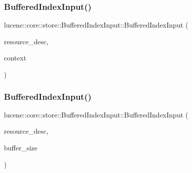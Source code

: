 \mbox{\label{classlucene_1_1core_1_1store_1_1BufferedIndexInput_ae480856ca86e73576266602d842c1391}} 
\subsubsection{\texorpdfstring{Buffered\+Index\+Input()}{BufferedIndexInput()}\hspace{0.1cm}{\footnotesize\ttfamily [2/3]}}
{\footnotesize\ttfamily lucene\+::core\+::store\+::\+Buffered\+Index\+Input\+::\+Buffered\+Index\+Input (\begin{DoxyParamCaption}\item[{\mbox{\hyperlink{ZlibCrc32_8h_a2c212835823e3c54a8ab6d95c652660e}{const}} std\+::string \&}]{resource\+\_\+desc,  }\item[{\mbox{\hyperlink{ZlibCrc32_8h_a2c212835823e3c54a8ab6d95c652660e}{const}} \mbox{\hyperlink{classlucene_1_1core_1_1store_1_1IOContext}{I\+O\+Context}} \&}]{context }\end{DoxyParamCaption})\hspace{0.3cm}{\ttfamily [inline]}}

\mbox{\label{classlucene_1_1core_1_1store_1_1BufferedIndexInput_a5c7bfec7bc319906f9ba40407818606d}} 
\subsubsection{\texorpdfstring{Buffered\+Index\+Input()}{BufferedIndexInput()}\hspace{0.1cm}{\footnotesize\ttfamily [3/3]}}
{\footnotesize\ttfamily lucene\+::core\+::store\+::\+Buffered\+Index\+Input\+::\+Buffered\+Index\+Input (\begin{DoxyParamCaption}\item[{\mbox{\hyperlink{ZlibCrc32_8h_a2c212835823e3c54a8ab6d95c652660e}{const}} std\+::string \&}]{resource\+\_\+desc,  }\item[{\mbox{\hyperlink{ZlibCrc32_8h_a2c212835823e3c54a8ab6d95c652660e}{const}} uint32\+\_\+t}]{buffer\+\_\+size }\end{DoxyParamCaption})\hspace{0.3cm}{\ttfamily [inline]}}



